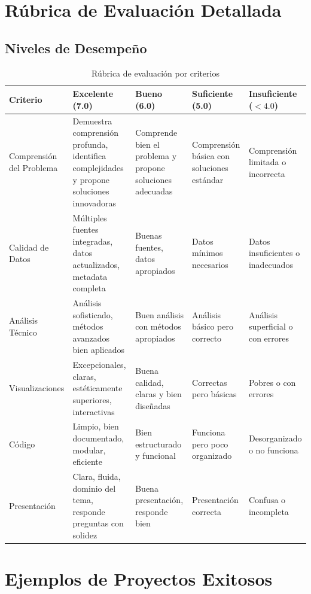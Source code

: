 \documentclass[11pt,a4paper]{article}
\begin{document}
\section{Rúbrica de Evaluación Detallada}

\subsection{Niveles de Desempeño}
\begin{table}[h!]
\centering
\small
\begin{tabularx}{\linewidth}{@{}l X X X X@{}}
\toprule
\textbf{Criterio} &
\textbf{Excelente (7.0)} &
\textbf{Bueno (6.0)} &
\textbf{Suficiente (5.0)} &
\textbf{Insuficiente ($<4.0$)}\\
\midrule
Comprensión del Problema &
Demuestra comprensión profunda, identifica complejidades y propone soluciones innovadoras &
Comprende bien el problema y propone soluciones adecuadas &
Comprensión básica con soluciones estándar &
Comprensión limitada o incorrecta\\
\addlinespace
Calidad de Datos &
Múltiples fuentes integradas, datos actualizados, metadata completa &
Buenas fuentes, datos apropiados &
Datos mínimos necesarios &
Datos insuficientes o inadecuados\\
\addlinespace
Análisis Técnico &
Análisis sofisticado, métodos avanzados bien aplicados &
Buen análisis con métodos apropiados &
Análisis básico pero correcto &
Análisis superficial o con errores\\
\addlinespace
Visualizaciones &
Excepcionales, claras, estéticamente superiores, interactivas &
Buena calidad, claras y bien diseñadas &
Correctas pero básicas &
Pobres o con errores\\
\addlinespace
Código &
Limpio, bien documentado, modular, eficiente &
Bien estructurado y funcional &
Funciona pero poco organizado &
Desorganizado o no funciona\\
\addlinespace
Presentación &
Clara, fluida, dominio del tema, responde preguntas con solidez &
Buena presentación, responde bien &
Presentación correcta &
Confusa o incompleta\\
\bottomrule
\end{tabularx}
\caption{Rúbrica de evaluación por criterios}
\end{table}

\section{Ejemplos de Proyectos Exitosos}
\end{document}
